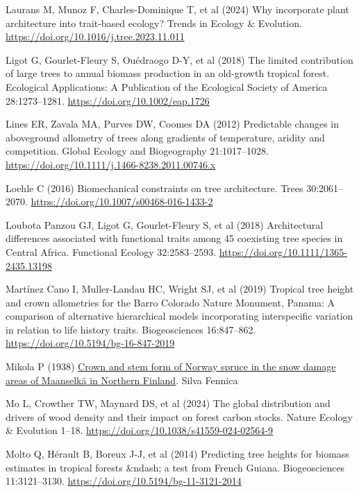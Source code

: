 \documentclass[
  12pt,
  letterpaper,
  DIV=11,
  numbers=noendperiod]{scrartcl}
\newlength{\cslhangindent}
\newenvironment{CSLReferences}[2] %
 {\begin{list}{}{%
  \setlength{\itemindent}{0pt}
  \setlength{\leftmargin}{0pt}
  \setlength{\parsep}{0pt}
  \ifodd #1
   \setlength{\leftmargin}{\cslhangindent}
   \setlength{\itemindent}{-1\cslhangindent}
  \fi
  \setlength{\itemsep}{#2\baselineskip}}}
 {\end{list}}
\begin{document}
\begin{CSLReferences}{1}{1}
Laurans M, Munoz F, Charles-Dominique T, et al (2024) Why incorporate
plant architecture into trait-based ecology? Trends in Ecology \&
Evolution. \url{https://doi.org/10.1016/j.tree.2023.11.011}

Ligot G, Gourlet-Fleury S, Ouédraogo D-Y, et al (2018) The limited
contribution of large trees to annual biomass production in an
old-growth tropical forest. Ecological Applications: A Publication of
the Ecological Society of America 28:1273--1281.
\url{https://doi.org/10.1002/eap.1726}

Lines ER, Zavala MA, Purves DW, Coomes DA (2012) Predictable changes in
aboveground allometry of trees along gradients of temperature, aridity
and competition. Global Ecology and Biogeography 21:1017--1028.
\url{https://doi.org/10.1111/j.1466-8238.2011.00746.x}

Loehle C (2016) Biomechanical constraints on tree architecture. Trees
30:2061--2070. \url{https://doi.org/10.1007/s00468-016-1433-2}

Loubota Panzou GJ, Ligot G, Gourlet-Fleury S, et al (2018) Architectural
differences associated with functional traits among 45 coexisting tree
species in {Central} {Africa}. Functional Ecology 32:2583--2593.
\url{https://doi.org/10.1111/1365-2435.13198}

Martínez Cano I, Muller-Landau HC, Wright SJ, et al (2019) Tropical tree
height and crown allometries for the {Barro} {Colorado} {Nature}
{Monument}, {Panama}: A comparison of alternative hierarchical models
incorporating interspecific variation in relation to life history
traits. Biogeosciences 16:847--862.
\url{https://doi.org/10.5194/bg-16-847-2019}

Mikola P (1938) \href{https://www.silvafennica.fi/article/4546}{Crown
and stem form of {Norway} spruce in the snow damage areas of {Maanselkä}
in {Northern} {Finland}}. Silva Fennica

Mo L, Crowther TW, Maynard DS, et al (2024) The global distribution and
drivers of wood density and their impact on forest carbon stocks. Nature
Ecology \& Evolution 1--18.
\url{https://doi.org/10.1038/s41559-024-02564-9}

Molto Q, Hérault B, Boreux J-J, et al (2014) Predicting tree heights for
biomass estimates in tropical forests \&ndash; a test from {French}
{Guiana}. Biogeosciences 11:3121--3130.
\url{https://doi.org/10.5194/bg-11-3121-2014}


\end{CSLReferences}
\end{document}
